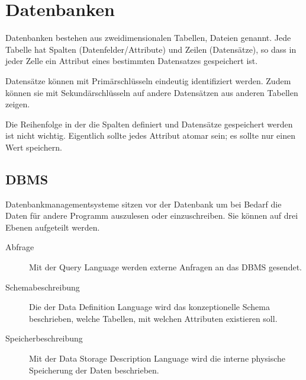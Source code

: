 \documentclass{article}
\begin{document}
\section{Datenbanken}
Datenbanken bestehen aus zweidimensionalen Tabellen, Dateien genannt. Jede Tabelle hat Spalten (Datenfelder/Attribute) und Zeilen (Datensätze), so dass in jeder Zelle ein Attribut eines bestimmten Datensatzes gespeichert ist.

Datensätze können mit Primärschlüsseln eindeutig identifiziert werden. Zudem können sie mit Sekundärschlüsseln auf andere Datensätzen aus anderen Tabellen zeigen.

Die Reihenfolge in der die Spalten definiert und Datensätze gespeichert werden ist nicht wichtig. Eigentlich sollte jedes Attribut atomar sein; es sollte nur einen Wert speichern.
\subsection{DBMS}
Datenbankmanagementsysteme sitzen vor der Datenbank um bei Bedarf die Daten für andere Programm auszulesen oder einzuschreiben. Sie können auf drei Ebenen aufgeteilt werden.
\begin{description}
 \item[Abfrage] Mit der Query Language werden externe Anfragen an das DBMS gesendet.
 \item[Schemabeschreibung] Die der Data Definition Language wird das konzeptionelle Schema beschrieben, welche Tabellen, mit welchen Attributen existieren soll.
 \item[Speicherbeschreibung] Mit der Data Storage Description Language wird die interne physische Speicherung der Daten beschrieben.
\end{description}
\end{document}
